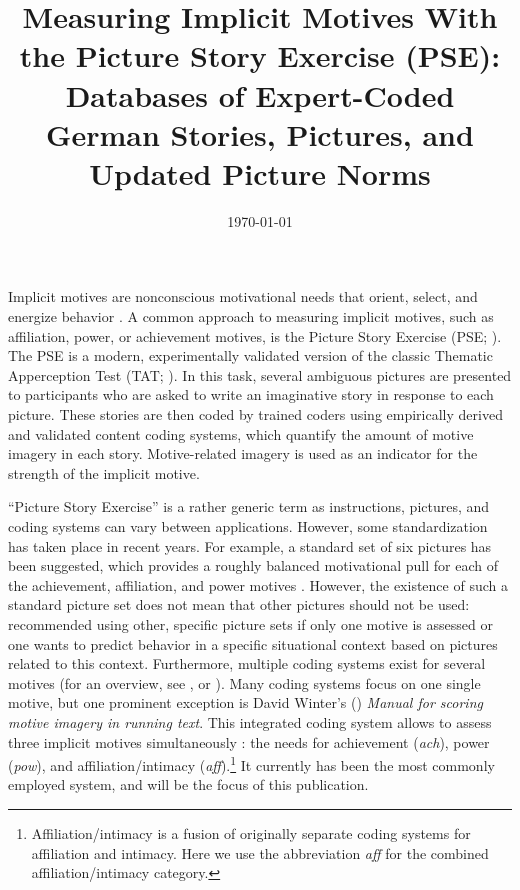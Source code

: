 \documentclass[man,a4paper,mask]{apa6}\usepackage[]{graphicx}\usepackage[]{color}
\title{Measuring Implicit Motives With the Picture Story Exercise (PSE): Databases of Expert-Coded German Stories, Pictures, and Updated Picture Norms}
\date{\today}
\begin{document}
\maketitle	%
Implicit motives are nonconscious motivational needs that orient, select, and energize behavior \parencite{mcclelland_human_1987}. A common approach to measuring implicit motives, such as affiliation, power, or achievement motives, is the Picture Story Exercise (PSE; ). The PSE is a modern, experimentally validated version of the classic Thematic Apperception Test (TAT; ). In this task, several ambiguous pictures are presented to participants who are asked to write an imaginative story in response to each picture. These stories are then coded by trained coders using empirically derived and validated content coding systems, which quantify the amount of motive imagery in each story. Motive-related imagery is used as an indicator for the strength of the implicit motive.

``Picture Story Exercise'' is a rather generic term as instructions, pictures, and coding systems can vary between applications. However, some standardization has taken place in recent years. For example, a standard set of six pictures has been suggested, which provides a roughly balanced motivational pull for each of the achievement, affiliation, and power motives \parencite{schultheiss_MeasuringImplicitMotives_2007}. However, the existence of such a standard picture set does not mean that other pictures should not be used: \textcite{schultheiss_MeasuringImplicitMotives_2007} recommended using other, specific picture sets if only one motive is assessed or one wants to predict behavior in a specific situational context based on pictures related to this context. Furthermore, multiple coding systems exist for several motives (for an overview, see , or ). Many coding systems focus on one single motive, but one prominent exception is David Winter's (\citeyear{winter_ManualScoringMotive_1994}) \emph{Manual for scoring motive imagery in running text}. This integrated coding system allows to assess three implicit motives simultaneously \parencite{winter_MeasuringPersonalityDistance_1991}: the needs for achievement (\emph{ach}), power (\emph{pow}), and affiliation/intimacy (\emph{aff}).\footnote{Affiliation/intimacy is a fusion of originally separate coding systems for affiliation and intimacy. Here we use the abbreviation \emph{aff} for the combined affiliation/intimacy category.} It currently has been the most commonly employed system, and will be the focus of this publication.
\end{document}
